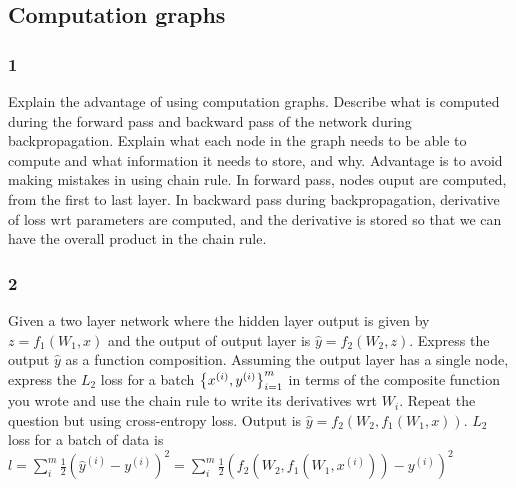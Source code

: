 \documentclass{article}
\begin{document}
\subsection*{Computation graphs}

\subsubsection*{1}
\begin{myleftlinebox}
    Explain the advantage of using computation graphs. Describe what is computed during the forward pass and backward pass of the network during backpropagation. Explain what each node in the graph needs to be able to compute and what information it needs to store, and why.
    \tcblower
    Advantage is to avoid making mistakes in using chain rule. In forward pass, nodes ouput are computed, from the first to last layer. In backward pass during backpropagation, derivative of loss wrt parameters are computed, and the derivative is stored so that we can have the overall product in the chain rule.
\end{myleftlinebox}

\subsubsection*{2}
\begin{myleftlinebox}
    Given a two layer network where the hidden layer output is given by \(z=f_1(W_1,x)\) and the output of output layer is \(\hat y = f_2(W_2,z)\). Express the output \(\hat y\) as a function composition. Assuming the output layer has a single node, express the \(L_2\) loss for a batch \(\left\{ x^{(i)},y^{(i)} \right\}_{i=1}^m\) in terms of the composite function you wrote and use the chain rule to write its derivatives wrt \(W_i\).  Repeat the question but using cross-entropy loss.
    \tcbline
    Output is \(\hat y = f_2(W_2,f_1(W_1,x))\). \(L_2\) loss for a batch of data is \(l=\sum_i^m \frac{1}{2}(\hat y^{(i)}-y^{(i)})^2 = \sum_i^m \frac{1}{2}(f_2(W_2,f_1(W_1,x^{(i)}))-y^{(i)})^2\) 
\end{myleftlinebox}
\end{document}
